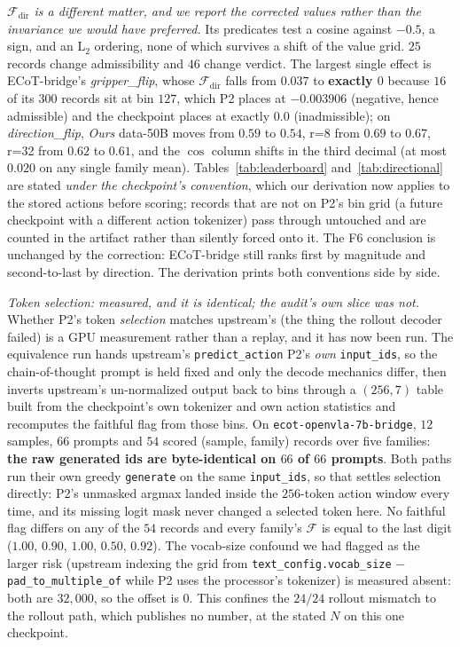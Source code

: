 \documentclass{article}
\begin{document}
\emph{$\mathcal{F}_{\text{dir}}$ is a different matter, and we report the corrected values rather than the invariance we would have preferred.} Its predicates test a cosine against $-0.5$, a sign, and an L$_2$ ordering, none of which survives a shift of the value grid. $25$ records change admissibility and $46$ change verdict. The largest single effect is ECoT-bridge's \emph{gripper\_flip}, whose $\mathcal{F}_{\text{dir}}$ falls from $0.037$ to \textbf{exactly $0$} because $16$ of its $300$ records sit at bin $127$, which P2 places at $-0.003906$ (negative, hence admissible) and the checkpoint places at exactly $0.0$ (inadmissible); on \emph{direction\_flip}, \emph{Ours} data-50B moves from $0.59$ to $0.54$, r=8 from $0.69$ to $0.67$, r=32 from $0.62$ to $0.61$, and the $\cos$ column shifts in the third decimal (at most $0.020$ on any single family mean). Tables~\ref{tab:leaderboard} and~\ref{tab:directional} are stated \emph{under the checkpoint's convention}, which our derivation now applies to the stored actions before scoring; records that are not on P2's bin grid (a future checkpoint with a different action tokenizer) pass through untouched and are counted in the artifact rather than silently forced onto it. The F6 conclusion is unchanged by the correction: ECoT-bridge still ranks first by magnitude and second-to-last by direction. The derivation prints both conventions side by side.

\emph{Token selection: measured, and it is identical; the audit's own slice was not.} Whether P2's token \emph{selection} matches upstream's (the thing the rollout decoder failed) is a GPU measurement rather than a replay, and it has now been run. The equivalence run hands upstream's \texttt{predict\_action} P2's \emph{own} \texttt{input\_ids}, so the chain-of-thought prompt is held fixed and only the decode mechanics differ, then inverts upstream's un-normalized output back to bins through a $(256,7)$ table built from the checkpoint's own tokenizer and own action statistics and recomputes the faithful flag from those bins. On \texttt{ecot-openvla-7b-bridge}, $12$ samples, $66$ prompts and $54$ scored (sample, family) records over five families: \textbf{the raw generated ids are byte-identical on $66$ of $66$ prompts}. Both paths run their own greedy \texttt{generate} on the same \texttt{input\_ids}, so that settles selection directly: P2's unmasked argmax landed inside the $256$-token action window every time, and its missing logit mask never changed a selected token here. No faithful flag differs on any of the $54$ records and every family's $\mathcal{F}$ is equal to the last digit ($1.00$, $0.90$, $1.00$, $0.50$, $0.92$). The vocab-size confound we had flagged as the larger risk (upstream indexing the grid from \texttt{text\_config.vocab\_size} ${-}$ \texttt{pad\_to\_multiple\_of} while P2 uses the processor's tokenizer) is measured absent: both are $32{,}000$, so the offset is $0$. This confines the $24/24$ rollout mismatch to the rollout path, which publishes no number, at the stated $N$ on this one checkpoint.
\end{document}
